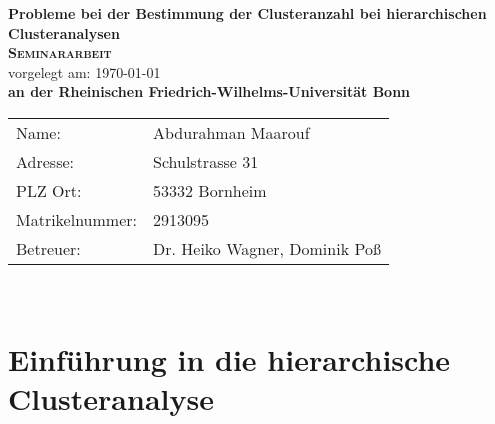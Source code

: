 \documentclass[12pt,titlepage]{article}
\begin{document}
	\thispagestyle{empty}

    \begin{titlepage}
    	\begin{center}
    		\huge \textbf{\textsf{Probleme bei der Bestimmung der Clusteranzahl bei hierarchischen Clusteranalysen}} \\
    		\vspace{2cm}
   	    	\LARGE\textbf{\textsc{Seminararbeit}}\\
    		\vspace{1cm}
    		\normalsize
    		vorgelegt am: \today \\
   	    	\vspace{2.5cm}
   	    	\large \textbf{an der Rheinischen Friedrich-Wilhelms-Universität Bonn}\\
   	    	\vspace{3cm}
    	\end{center}
		\normalsize{
			\begin{tabular}{ll}
    				Name: & {Abdurahman Maarouf} \\
				Adresse: & {Schulstrasse 31} \\
				PLZ Ort: & {53332 Bornheim} \\
    				Matrikelnummer: & {2913095} \\
				Betreuer: & {Dr. Heiko Wagner, Dominik Poß} \\
    			\end{tabular}\\
		}
	\end{titlepage}

	\thispagestyle{empty}

	\tableofcontents

	\newpage


	\setcounter{page}{1}

	\section{Einführung in die hierarchische Clusteranalyse}
\end{document}
